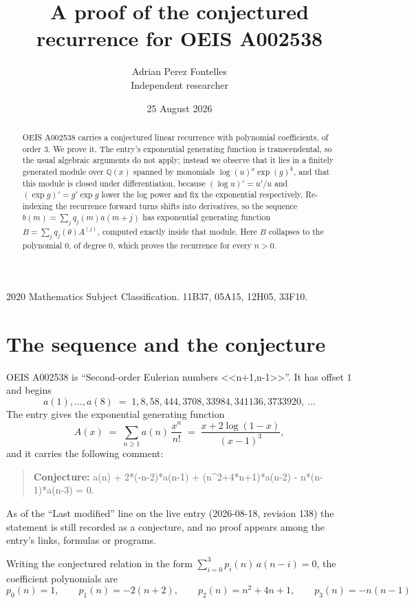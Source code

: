 \documentclass[11pt,a4paper]{article}
\title{A proof of the conjectured recurrence for OEIS A002538}
\author{Adrian Perez Fontelles\\ \small Independent researcher}
\date{25 August 2026}
\theoremstyle{plain}
\theoremstyle{definition}
\begin{document}
\maketitle

\begin{abstract}
OEIS A002538 carries a conjectured linear recurrence with polynomial coefficients, of
order 3. We prove it. The entry's exponential generating function is
transcendental, so the usual algebraic arguments do not apply; instead we observe that it
lies in a finitely generated module over $\mathbb{Q}(x)$ spanned by monomials
$\log(u)^{a}\exp(g)^{k}$, and that this module is closed under differentiation, because
$(\log u)'=u'/u$ and $(\exp g)'=g'\exp g$ lower the log power and fix the exponential
respectively. Re-indexing the recurrence forward turns shifts into derivatives, so the
sequence $b(m)=\sum_{j}q_{j}(m)a(m+j)$ has exponential generating function
$B=\sum_{j}q_{j}(\theta)A^{(j)}$, computed exactly inside that module. Here $B$ collapses
to the polynomial $0$, of degree $0$, which proves the recurrence for every
$n>0$.
\end{abstract}

\noindent\small 2020 Mathematics Subject Classification. 11B37, 05A15, 12H05, 33F10.\normalsize

\section{The sequence and the conjecture}

OEIS A002538 is ``Second-order Eulerian numbers <<n+1,n-1>>''. It has offset $1$ and begins
\[
a(1),\dots,a(8)\;=\;1, 8, 58, 444, 3708, 33984, 341136, 3733920,\ \dots
\]
The entry gives the exponential generating function
\begin{equation}\label{eq:gf}
A(x)\;=\;\sum_{n\ge 1} a(n)\,\frac{x^{n}}{n!}\;=\;\frac{x + 2 \log{\left(1 - x \right)}}{\left(x - 1\right)^{3}} ,
\end{equation}
and it carries the following comment:
\begin{quote}\small
\textbf{Conjecture:} a(n) + 2*(-n-2)*a(n-1) + (n\textasciicircum{}2+4*n+1)*a(n-2) - n*(n-1)*a(n-3) = 0.
\end{quote}
As of the ``Last modified'' line on the live entry (2026-08-18, revision 138) the
statement is still recorded as a conjecture, and no proof appears among the entry's links,
formulas or programs.

Writing the conjectured relation in the form $\sum_{i=0}^{3}p_{i}(n)\,a(n-i)=0$,
the coefficient polynomials are
\[
p_{0}(n)=1,\qquad p_{1}(n)=- 2 \left(n + 2\right),\qquad p_{2}(n)=n^{2} + 4 n + 1,\qquad p_{3}(n)=- n \left(n - 1\right)
\]
\end{document}

